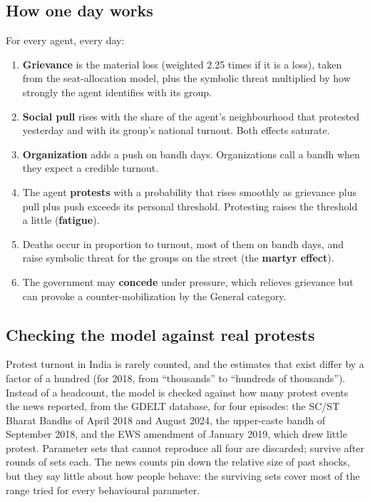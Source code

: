 \documentclass[11pt,a4paper]{article}
\begin{document}
\subsection{How one day works}
For every agent, every day:
\begin{enumerate}
\item \textbf{Grievance} is the material loss (weighted 2.25 times if it is a loss), taken from the seat-allocation model, plus the symbolic threat multiplied by how strongly the agent identifies with its group.
\item \textbf{Social pull} rises with the share of the agent's neighbourhood that protested yesterday and with its group's national turnout. Both effects saturate.
\item \textbf{Organization} adds a push on bandh days. Organizations call a bandh when they expect a credible turnout.
\item The agent \textbf{protests} with a probability that rises smoothly as grievance plus pull plus push exceeds its personal threshold. Protesting raises the threshold a little (\textbf{fatigue}).
\item Deaths occur in proportion to turnout, most of them on bandh days, and raise symbolic threat for the groups on the street (the \textbf{martyr effect}).
\item The government may \textbf{concede} under pressure, which relieves grievance but can provoke a counter-mobilization by the General category.
\end{enumerate}

\subsection{Checking the model against real protests}
Protest turnout in India is rarely counted, and the estimates that exist differ by a factor of a hundred (for 2018, from ``thousands'' to ``hundreds of thousands''). Instead of a headcount, the model is checked against how many protest events the news reported, from the GDELT database, for four episodes: the SC/ST Bharat Bandhs of April 2018 and August 2024, the upper-caste bandh of September 2018, and the EWS amendment of January 2019, which drew little protest. Parameter sets that cannot reproduce all four are discarded; \CalibKept{} survive after \CalibWaves{} rounds of \CalibWaveSize{} sets each. The news counts pin down the relative size of past shocks, but they say little about how people behave: the surviving sets cover most of the range tried for every behavioural parameter.
\end{document}
